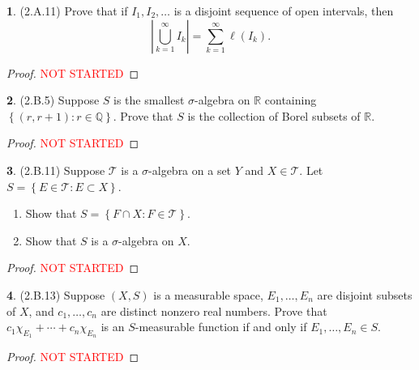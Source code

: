 \documentclass[12pt]{article}
\theoremstyle{definition}
\newtheorem{ex}{}
\begin{document}
\begin{ex}
	(2.A.11)
	Prove that if $I_1, I_2, \dots $ is a disjoint sequence of open intervals, then \begin{equation*}
		\left| \bigcup_{k=1}^\infty I_k \right| = \sum_{k=1}^\infty \ell(I_k).
	\end{equation*}
\end{ex}
\begin{proof}
	\textcolor{red}{NOT STARTED}
\end{proof}

\begin{ex}
	(2.B.5)
	Suppose $S$ is the smallest $\sigma$-algebra on $\mathbb{R}$ containing $\left\lbrace (r, r+1) : r \in \mathbb{Q} \right\rbrace$.
	Prove that $S$ is the collection of Borel subsets of $\mathbb{R}$.
\end{ex}
\begin{proof}
	\textcolor{red}{NOT STARTED}
\end{proof}

\begin{ex}
	(2.B.11)
	Suppose $\mathcal{T}$ is a $\sigma$-algebra on a set $Y$ and $X \in \mathcal{T}$.
	Let $S = \left\lbrace E \in \mathcal{T} : E \subset X \right\rbrace$. \begin{enumerate}[label=(\alph*)]
		\item Show that $S = \left\lbrace F \cap X : F \in \mathcal{T} \right\rbrace$.
		\item Show that $S$ is a $\sigma$-algebra on $X$.
	\end{enumerate}
\end{ex}
\begin{proof}
	\textcolor{red}{NOT STARTED}
\end{proof}

\begin{ex}
	(2.B.13)
	Suppose $(X, S)$ is a measurable space, $E_1, \dots, E_n$ are disjoint subsets of $X$, and $c_1, \dots, c_n$ are distinct nonzero real numbers.
	Prove that $c_1 \chi_{E_1} + \cdots + c_n\chi_{E_n}$ is an $S$-measurable function if and only if $E_1, \dots, E_n \in S$.
\end{ex}
\begin{proof}
	\textcolor{red}{NOT STARTED}
\end{proof}
\end{document}
